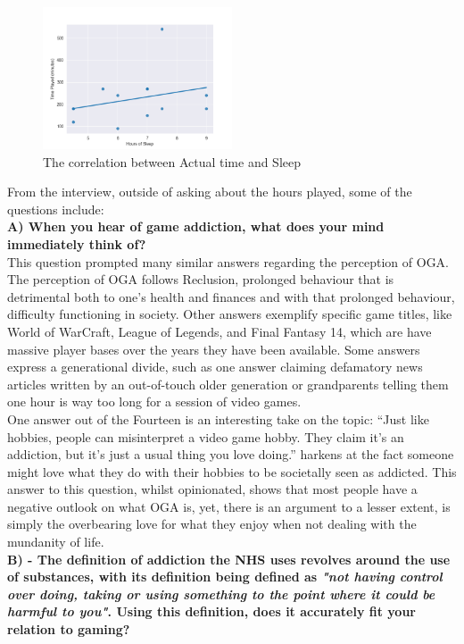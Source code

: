 \documentclass[conference]{IEEEtran}
\begin{document}
\begin{figure}[H]
\includegraphics[width = 0.5\textwidth]{Graph3}
\caption{The correlation between Actual time and Sleep}
\label{tab:figure8}
\end{figure}


From the interview, outside of asking about the hours played, some of the questions include:\\

 \textbf{A) When you hear of game addiction, what does your mind immediately think of?}\\

This question prompted many similar answers regarding the perception of OGA. The perception of OGA follows Reclusion, prolonged behaviour that is detrimental both to one’s health and finances and with that prolonged behaviour, difficulty functioning in society. Other answers exemplify specific game titles, like World of WarCraft\cite{Entertainment2004}, League of Legends\cite{Games2009}, and Final Fantasy 14\cite{Enix2013}, which are have massive player bases over the years they have been available. Some answers express a generational divide, such as one answer claiming defamatory news articles written by an out-of-touch older generation or grandparents telling them one hour is way too long for a session of video games.\\

One answer out of the Fourteen is an interesting take on the topic: “Just like hobbies, people can misinterpret a video game hobby. They claim it’s an addiction, but it’s just a usual thing you love doing.” harkens at the fact someone might love what they do with their hobbies to be societally seen as addicted. This answer to this question, whilst opinionated, shows that most people have a negative outlook on what OGA is, yet, there is an argument to a lesser extent, is simply the overbearing love for what they enjoy when not dealing with the mundanity of life.\\

 \textbf{B) - The definition of addiction the NHS uses revolves around the use of substances, with its definition being defined as \textit{"not having control over doing, taking or using something to the point where it could be harmful to you"}. Using this definition, does it accurately fit your relation to gaming?}\\
\end{document}
